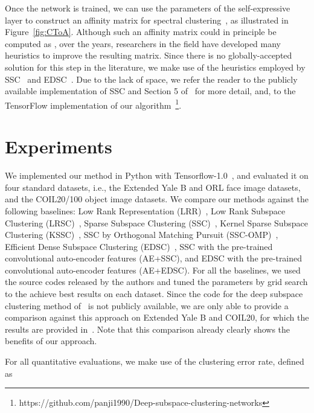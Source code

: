 \documentclass{article}
\begin{document}
Once the network is trained, we can use the parameters of the self-expressive layer to construct an affinity matrix for spectral clustering~\cite{ng2001spectral}, as illustrated in Figure~\ref{fig:CToA}. Although such an affinity matrix could in principle be computed as , over the years, researchers in the field have developed many heuristics to improve the resulting matrix. 
Since there is no globally-accepted solution for this step in the literature, we make use of the heuristics employed by SSC~\cite{elhamifar2013sparse} and EDSC~\cite{ji2014efficient}. Due to the lack of space, we refer the reader to the publicly available implementation of SSC and Section 5 of~\cite{ji2014efficient} for more detail, and, to the TensorFlow implementation of our algorithm~\footnote{https://github.com/panji1990/Deep-subspace-clustering-networks}.





\section{Experiments}

We implemented our method in Python with Tensorflow-1.0~\cite{abadi2016tensorflow}, and  evaluated it on four standard datasets, i.e., the Extended Yale B and ORL face image datasets, and the COIL20/100 object image datasets. We compare our methods against the following baselines: Low Rank Representation (LRR)~\cite{liu2013robust}, Low Rank Subspace Clustering (LRSC)~\cite{vidal2014low}, Sparse Subspace Clustering (SSC)~\cite{elhamifar2013sparse}, Kernel Sparse Subspace Clustering (KSSC)~\cite{patel2014kernel}, SSC by Orthogonal Matching Pursuit (SSC-OMP)~\cite{you2016scalable}, Efficient Dense Subspace Clustering (EDSC)~\cite{ji2014efficient}, SSC with the pre-trained convolutional auto-encoder features (AE+SSC), and EDSC with the pre-trained convolutional auto-encoder features (AE+EDSC). For all the baselines, we used the source codes released by the authors and tuned the parameters by grid search to the achieve best results on each dataset. Since the code for the deep subspace clustering method of~\cite{peng2016deep} is not publicly available, we are only able to provide a comparison against this approach on Extended Yale B and COIL20, for which the results are provided in~\cite{peng2016deep}. Note that this comparison already clearly shows the benefits of our approach.



For all quantitative evaluations, we make use of the clustering error rate, defined as
\end{document}
